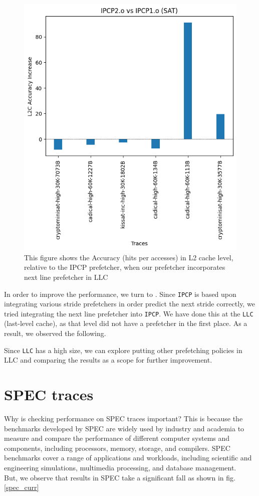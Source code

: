 \documentclass[conference]{IEEEtran}
\begin{document}
\begin{figure}
\includegraphics[scale=0.5]{Images/Bingo/sat_l2c.png}
\caption{This figure shows the Accuracy (hits per accesses) in L2 cache level, relative to the IPCP prefetcher, when our prefetcher incorporates next line prefetcher in LLC}
\label{sat_l2c}
\end{figure}

In order to improve the performance, we turn to \cite{b3}. Since \verb|IPCP| is based upon integrating various stride prefetchers in order predict the next stride correctly, we tried integrating the next line prefetcher into \verb|IPCP|. We have done this at the \verb|LLC| (last-level cache), as that level did not have a prefetcher in the first place. As a result, we observed the following. %


Since \verb|LLC| has a high size, we can explore putting other prefetching policies in LLC and comparing the results as a scope for further improvement.

\section{SPEC traces}
Why is checking performance on SPEC traces important? This is because the benchmarks developed by SPEC are widely used by industry and academia to measure and compare the performance of different computer systems and components, including processors, memory, storage, and compilers. SPEC benchmarks cover a range of applications and workloads, including scientific and engineering simulations, multimedia processing, and database management. \\ 
But, we observe that results in SPEC take a significant fall as shown in fig. \ref{spec_curr}
\end{document}
